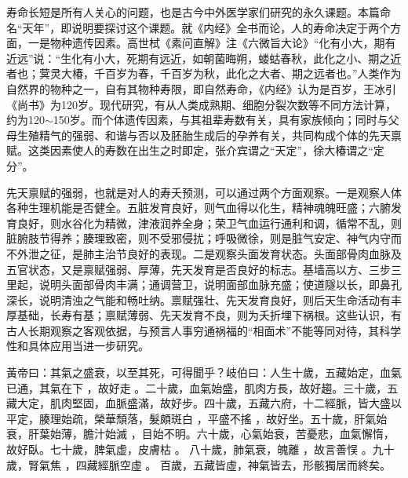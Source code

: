 \documentclass[draft,12pt]{ctexbook}
\begin{document}


寿命长短是所有人关心的问题，也是古今中外医学家们研究的永久课题。本篇命名“天年”，即说明要探讨这个课题。就《内经》全书而论，人的寿命决定于两个方面，一是物种遗传因素。高世栻《素问直解》注《六微旨大论》“化有小大，期有近远”说：“生化有小大，死期有远近，如朝菌晦朔，蝼蛄春秋，此化之小、期之近者也；蓂灵大椿，千百岁为春，千百岁为秋，此化之大者、期之远者也。”人类作为自然界的物种之一，自有其物种寿限，即自然寿命，《内经》认为是百岁，王冰引《尚书》为120岁。现代研究，有从人类成熟期、细胞分裂次数等不同方法计算，约为120$\sim$150岁。而个体遗传因素，与其祖辈寿数有关，具有家族倾向；同时与父母生殖精气的强弱、和谐与否以及胚胎生成后的孕养有关，共同构成个体的先天禀赋。这类因素使人的寿数在出生之时即定，张介宾谓之“天定”，徐大椿谓之“定分”。

先天禀赋的强弱，也就是对人的寿夭预测，可以通过两个方面观察。一是观察人体各种生理机能是否健全。五脏发育良好，则气血得以化生，精神魂魄旺盛；六腑发育良好，则水谷化为精微，津液润养全身；荣卫气血运行通利和调，循常不乱，则脏腑肢节得养；腠理致密，则不受邪侵扰；呼吸微徐，则是脏气安定、神气内守而不外泄之征，是肺主治节良好的表现。二是观察头面发育状态。头面部骨肉血脉及五官状态，又是禀赋强弱、厚薄，先天发育是否良好的标志。基墙高以方、三步三里起，说明头面部骨肉丰满；通调营卫，说明面部血脉充盛；使道隧以长，即鼻孔深长，说明清浊之气能和畅吐纳。禀赋强壮、先天发育良好，则后天生命活动有丰厚基础，长寿有基；禀赋薄弱、先天发育不良，则为夭折埋下祸根。这些认识，有古人长期观察之客观依据，与预言人事穷通祸福的“相面术”不能等同对待，其科学性和具体应用当进一步研究。


\begin{yuanwen}
黃帝曰：其氣之盛衰，以至其死，可得聞乎？岐伯曰：人生十歲，五藏始定，血氣已通，其氣在下 ，故好走 。二十歲，血氣始盛，肌肉方長，故好趨。三十歲，五藏大定，肌肉堅固，血脈盛滿，故好步。四十歲，五藏六府，十二經脈，皆大盛以平定，腠理始疏，榮華頹落，髮頗斑白 ，平盛不搖 ，故好坐。五十歲，肝氣始衰，肝葉始薄，膽汁始滅 ，目始不明。六十歲，心氣始衰，苦憂悲，血氣懈惰，故好臥。七十歲，脾氣虚，皮膚枯 。 八十歲，肺氣衰，魄離 ，故言善悮 。九十歲，腎氣焦 ，四藏經脈空虛 。 百歲，五藏皆虛，神氣皆去，形骸獨居而終矣。
\end{yuanwen}

\end{document}
